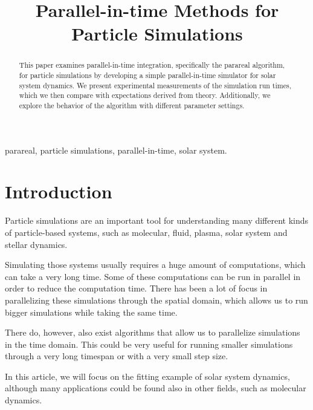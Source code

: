 \documentclass[conference]{IEEEtran}
\begin{document}
\title{Parallel-in-time Methods for Particle Simulations}

\author{
}

\maketitle

\begin{abstract}
This paper examines parallel-in-time integration, specifically the parareal algorithm, for particle simulations by developing a simple parallel-in-time simulator for solar system dynamics. We present experimental measurements of the simulation run times, which we then compare with expectations derived from theory. Additionally, we explore the behavior of the algorithm with different parameter settings.
\end{abstract}

\begin{IEEEkeywords}
parareal, particle simulations, parallel-in-time, solar system.
\end{IEEEkeywords}

\section{Introduction}

Particle simulations are an important tool for understanding many different kinds of particle-based systems, such as molecular, fluid, plasma, solar system and stellar dynamics.

Simulating those systems usually requires a huge amount of computations, which can take a very long time. Some of these computations can be run in parallel in order to reduce the computation time. There has been a lot of focus in parallelizing these simulations through the spatial domain, which allows us to run bigger simulations while taking the same time.

There do, however, also exist algorithms that allow us to parallelize simulations in the time domain. This could be very useful for running smaller simulations through a very long timespan or with a very small step size. 

In this article, we will focus on the fitting example of solar system dynamics, although many applications could be found also in other fields, such as molecular dynamics. \cite{moldyn}
\end{document}
